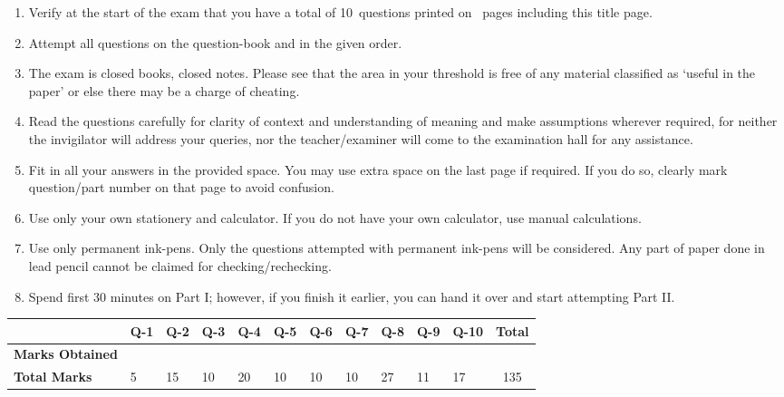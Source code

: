 \documentclass[12pt,a4paper]{article}
\newcommand\TotalMarks{135}
\newcommand\TotalQuestions{10}
\newcommand\TotalPages{\pageref{LastPage}} %
\def\Qone{5}
\def\Qtwo{15}
\def\Qthree{10}
\def\Qfour{20}
\def\Qfive{10}
\def\Qsix{10}
\def\Qseven{10}
\def\Qeight{27}
\def\Qnine{11}
\def\Qten{17}
\begin{document}
\begin{enumerate}
\itemsep0em
\item Verify at the start of the exam that you have a total of \TotalQuestions~questions printed on \TotalPages~pages including this title page.
\item Attempt all questions on the question-book and in the given order.
\item The exam is closed books, closed notes. Please see that the area in your threshold is free of any material classified as `useful in the paper' or else there may be a charge of cheating.
\item Read the questions carefully for clarity of context and understanding of meaning and make assumptions wherever required, for neither the invigilator will address your queries, nor the teacher/examiner will come to the examination hall for any assistance.
\item Fit in all your answers in the provided space. You may use extra space on the last page if required. If you do so, clearly mark question/part number on that page to avoid confusion. 
\item Use only your own stationery and calculator. If you do not have your own calculator, use manual calculations. 
\item Use only permanent ink-pens. Only the questions attempted with permanent ink-pens will be considered. Any part of paper done in lead pencil cannot be claimed for checking/rechecking.
\item Spend first 30 minutes on Part I; however, if you finish it earlier, you can hand it over and start attempting Part II.
\end{enumerate}
\begin{table}[H]
\begin{center}
\vspace{0.3cm}
	{\footnotesize \begin{tabular}{|C{1.8cm}|C{0.75cm}|C{0.75cm}|C{0.75cm}|C{0.75cm}|C{0.75cm}|C{0.75cm}|C{0.75cm}|C{0.75cm}|C{0.75cm}|C{0.75cm}|c|}
	\hline
		\rule{0pt}{2.6ex} & Q-1 & Q-2 & Q-3 & Q-4 & Q-5 & Q-6 & Q-7 & Q-8 & Q-9 & Q-10 & \textbf{Total}\\
		\hline
		\textbf{Marks Obtained}\rule{0pt}{2.6ex}& & & & & & & & & & &\\
		\hline
		\textbf{Total Marks}\rule{0pt}{2.6ex}& \Qone & \Qtwo & \Qthree & \Qfour & \Qfive & \Qsix & \Qseven & \Qeight & \Qnine & \Qten & \TotalMarks\\
	\hline
	\end{tabular}}
\end{center}
\end{table}
\end{document}
